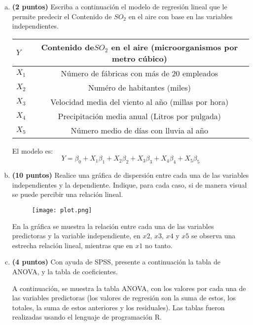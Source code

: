\documentclass[../main.tex]{subfiles}
\begin{document}
\begin{enumerate}[(a)]

\item \textbf{(2 puntos)} Escriba a continuación el modelo de regresión lineal que le permite predecir el Contenido de $SO_2$ en el aire con base en las variables independientes.

\begin{center}
  \begin{tabular}{ | l | c | }
    \hline
    $Y$ & Contenido de$ SO_2$ en el aire (microorganismos por metro cúbico) \\ \hline
    $X_1$ & Número de fábricas con más de 20 empleados \\ \hline
    $X_2$ & Numéro de habitantes (miles) \\ \hline
    $X_3$ & Velocidad media del viento al año (millas por hora) \\ \hline
    $X_4$ & Precipitación media anual (Litros por pulgada) \\ \hline
    $X_5$ & Número medio de días con lluvia al año \\
    \hline
  \end{tabular}
\end{center}

El modelo es:
$$Y = \beta_0 + X_1 \beta_1+ X_2 \beta_2+ X_3 \beta_3+ X_4 \beta_4+ X_5 \beta_5$$

\pagebreak

\item \textbf{(10 puntos)} Realice una gráfica de dispersión entre cada una de las variables
independientes y la dependiente. Indique, para cada caso, si de manera visual se puede
percibir una relación lineal.

\begin{figure}[h]
\centering
\texttt{[image: plot.png]}
\label{fig:img1}
\end{figure}

En la gráfica se muestra la relación entre cada una de las variables predictoras y la variable independiente, en $x2$, $x3$, $x4$ y $x5$ se observa una estrecha relación lineal, mientras que en $x1$ no tanto.

\pagebreak

\item \textbf{(4 puntos)} Con ayuda de SPSS, presente a continuación la tabla de ANOVA, y la tabla de coeficientes.

A continuación, se muestra la tabla ANOVA, con los valores por cada una de las variables predictoras (los valores de regresión son la suma de estos, los totales, la suma de estos anteriores y los residuales). Las tablas fueron realizadas usando el lenguaje de programación R.


\end{enumerate}
\end{document}

